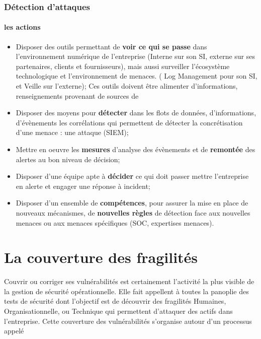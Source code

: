 \begin{frame}
\frametitle<presentation>{Détection d'attaques}
\framesubtitle<presentation>{les actions}
\begin{itemize}
  \item Disposer des outils permettant de \textbf{voir ce qui se passe} dans l'environnement numérique de l'entreprise (Interne sur son SI, externe sur ses partenaires, clients et fournisseurs), mais aussi surveiller l'écosystème technologique et l'environnement de menaces. ( Log Management pour son SI, et Veille sur l'externe); Ces outils doivent être alimenter d'informations, renseignements provenant de sources de 
  \item Disposer des moyens  pour \textbf{détecter} dans les flots de données, d'informations, d'évènements les corrélations qui permettent de détecter la concrétisation d'une menace : une attaque (SIEM);
  \item Mettre en oeuvre les \textbf{mesures} d'analyse des évènements et de \textbf{remontée} des alertes au bon niveau de décision;
  \item Disposer d'une équipe apte à \textbf{décider} ce qui doit passer mettre l'entreprise en alerte et engager une réponse à incident;
  \item Disposer d'un ensemble de \textbf{compétences}, pour assurer la mise en place de nouveaux mécanismes, de \textbf{nouvelles règles }de détection face aux nouvelles menaces ou aux menaces spécifiques (SOC, expertises menaces).
\end{itemize}
\end{frame}

\section{La couverture des fragilités}

Couvrir ou corriger ses vulnérabilités est certainement l'activité la plus visible de la gestion de sécurité opérationnelle. Elle fait appellent à toutes la panoplie des tests de sécurité dont l'objectif est de découvrir des fragilités Humaines, Organisationnelle, ou Technique qui permettent d'attaquer des actifs dans l'entreprise.
Cette couverture des vulnérabilités s'organise autour d'un processus appelé 

